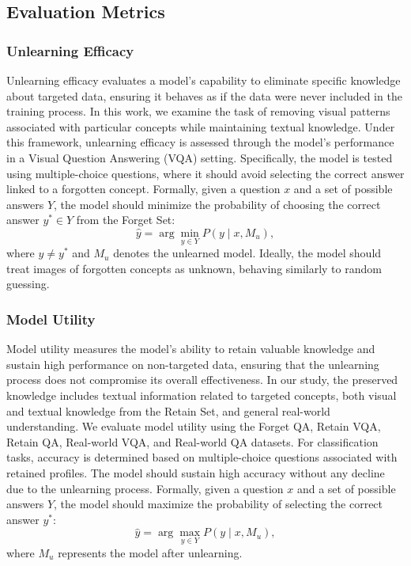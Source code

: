 \subsection{Evaluation Metrics}\label{app:metrics}
\subsubsection{Unlearning Efficacy}
Unlearning efficacy evaluates a model's capability to eliminate specific knowledge about targeted data, ensuring it behaves as if the data were never included in the training process. In this work, we examine the task of removing visual patterns associated with particular concepts while maintaining textual knowledge. Under this framework, unlearning efficacy is assessed through the model’s performance in a Visual Question Answering (VQA) setting. Specifically, the model is tested using multiple-choice questions, where it should avoid selecting the correct answer linked to a forgotten concept. Formally, given a question $x$ and a set of possible answers $Y$, the model should minimize the probability of choosing the correct answer $y^* \in Y$ from the Forget Set:
\begin{equation}
    \hat{y} = \arg\min_{y \in Y} P(y \mid x, M_u),
\end{equation}
where $y \neq y^*$ and $M_u$ denotes the unlearned model. Ideally, the model should treat images of forgotten concepts as unknown, behaving similarly to random guessing.

\subsubsection{Model Utility}
Model utility measures the model’s ability to retain valuable knowledge and sustain high performance on non-targeted data, ensuring that the unlearning process does not compromise its overall effectiveness. In our study, the preserved knowledge includes textual information related to targeted concepts, both visual and textual knowledge from the Retain Set, and general real-world understanding. We evaluate model utility using the Forget QA, Retain VQA, Retain QA, Real-world VQA, and Real-world QA datasets. For classification tasks, accuracy is determined based on multiple-choice questions associated with retained profiles. The model should sustain high accuracy without any decline due to the unlearning process. Formally, given a question $x$ and a set of possible answers $Y$, the model should maximize the probability of selecting the correct answer $y^*$:
\begin{equation}
    \hat{y} = \arg\max_{y \in Y} P(y \mid x, M_u),
\end{equation}
where $M_u$ represents the model after unlearning.

